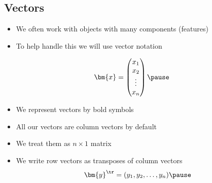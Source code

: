 \begin{slide}
\section[-2]{Vectors}

\begin{PauseHighLight}
  \begin{itemize}
  \item We often work with objects with many components (features)\pause
  \item To help handle this we will use vector notation\pause
  \end{itemize}
  \begin{minipage}{0.29\linewidth}
    \begin{align*}
      \bm{x} =
      \begin{pmatrix}
        x_1 \\ x_2 \\ \vdots \\ x_n
      \end{pmatrix}\pause
    \end{align*}
  \end{minipage}
  \begin{minipage}{0.69\linewidth}
    \begin{itemize}
    \item We represent vectors by bold symbols\pause
    \item All our vectors are column vectors by default\pause
    \item We treat them as $n\times 1$ matrix\pause
    \end{itemize}
  \end{minipage}
  \begin{itemize}
  \item We write row vectors as transposes of column vectors
    \begin{align*}
      \bm{y}^\tr = (y_1, y_2, \ldots, y_n)\pause
    \end{align*}
  \end{itemize}
\end{PauseHighLight}
\end{slide}



